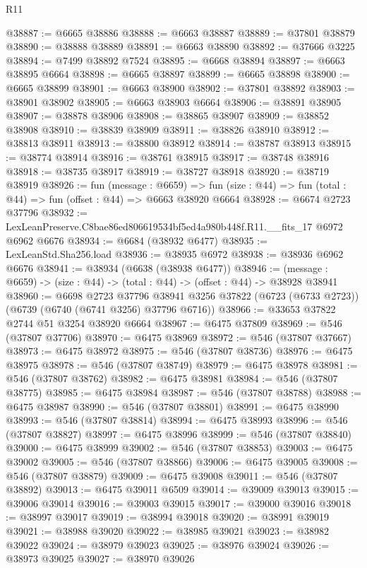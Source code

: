 \begin{lexlean}{R11}
\begin{coremodule}
@38887 := @6665 @38886
@38888 := @6663 @38887
@38889 := @37801 @38879
@38890 := @38888 @38889
@38891 := @6663 @38890
@38892 := @37666 @3225
@38894 := @7499 @38892 @7524
@38895 := @6668 @38894
@38897 := @6663 @38895 @6664
@38898 := @6665 @38897
@38899 := @6665 @38898
@38900 := @6665 @38899
@38901 := @6663 @38900
@38902 := @37801 @38892
@38903 := @38901 @38902
@38905 := @6663 @38903 @6664
@38906 := @38891 @38905
@38907 := @38878 @38906
@38908 := @38865 @38907
@38909 := @38852 @38908
@38910 := @38839 @38909
@38911 := @38826 @38910
@38912 := @38813 @38911
@38913 := @38800 @38912
@38914 := @38787 @38913
@38915 := @38774 @38914
@38916 := @38761 @38915
@38917 := @38748 @38916
@38918 := @38735 @38917
@38919 := @38727 @38918
@38920 := @38719 @38919
@38926 := fun (message : @6659) =>
  fun (size : @44) => fun (total : @44) => fun (offset : @44) => @6663 @38920 @6664
@38928 := @6674 @2723 @37796
@38932 := LexLeanPreserve.C8bae86ed806619534bf5ed4a980b448f.R11.__fits_17 @6972 @6962 @6676
@38934 := @6684 (@38932 @6477)
@38935 := LexLeanStd.Sha256.load
@38936 := @38935 @6972
@38938 := @38936 @6962 @6676
@38941 := @38934 (@6638 (@38938 @6477))
@38946 := (message : @6659) -> (size : @44) -> (total : @44) -> (offset : @44) -> @38928 @38941
@38960 := @6698
    @2723
    @37796
    @38941
    @3256
    @37822
    (@6723 (@6733 @2723))
    (@6739 (@6740 (@6741 @3256) @37796 @6716))
@38966 := @33653 @37822 @2744 @51 @3254 @38920 @6664
@38967 := @6475 @37809
@38969 := @546 (@37807 @37706)
@38970 := @6475 @38969
@38972 := @546 (@37807 @37667)
@38973 := @6475 @38972
@38975 := @546 (@37807 @38736)
@38976 := @6475 @38975
@38978 := @546 (@37807 @38749)
@38979 := @6475 @38978
@38981 := @546 (@37807 @38762)
@38982 := @6475 @38981
@38984 := @546 (@37807 @38775)
@38985 := @6475 @38984
@38987 := @546 (@37807 @38788)
@38988 := @6475 @38987
@38990 := @546 (@37807 @38801)
@38991 := @6475 @38990
@38993 := @546 (@37807 @38814)
@38994 := @6475 @38993
@38996 := @546 (@37807 @38827)
@38997 := @6475 @38996
@38999 := @546 (@37807 @38840)
@39000 := @6475 @38999
@39002 := @546 (@37807 @38853)
@39003 := @6475 @39002
@39005 := @546 (@37807 @38866)
@39006 := @6475 @39005
@39008 := @546 (@37807 @38879)
@39009 := @6475 @39008
@39011 := @546 (@37807 @38892)
@39013 := @6475 @39011 @6509
@39014 := @39009 @39013
@39015 := @39006 @39014
@39016 := @39003 @39015
@39017 := @39000 @39016
@39018 := @38997 @39017
@39019 := @38994 @39018
@39020 := @38991 @39019
@39021 := @38988 @39020
@39022 := @38985 @39021
@39023 := @38982 @39022
@39024 := @38979 @39023
@39025 := @38976 @39024
@39026 := @38973 @39025
@39027 := @38970 @39026

\end{coremodule}
\end{lexlean}
